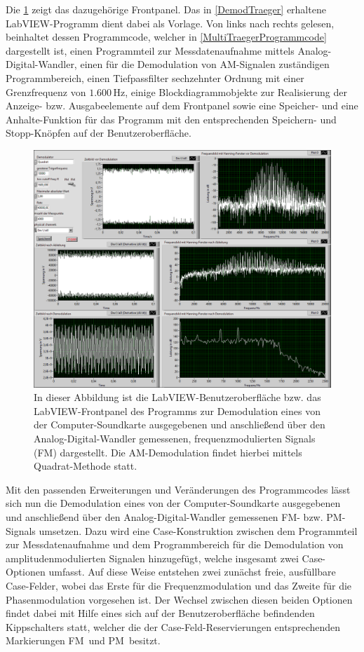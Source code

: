 \documentclass[
a4paper,
12pt,
pagesize,
ngerman
]{scrartcl}
\begin{document}
	\noindent Die \cref{FMPMDemodFrontpanel} zeigt das dazugehörige Frontpanel.
	Das in \cref{DemodTraeger} erhaltene LabVIEW-Programm dient dabei als Vorlage. 
	Von links nach rechts gelesen, beinhaltet dessen Programmcode, welcher in \cref{MultiTraegerProgrammcode} dargestellt ist, einen Programmteil zur Messdatenaufnahme mittels Analog-Digital-Wandler, einen für die Demodulation von AM-Signalen zuständigen Programmbereich, einen Tiefpassfilter sechzehnter Ordnung mit einer Grenzfrequenz von $1.600\,$Hz, einige Blockdiagrammobjekte zur Realisierung der Anzeige- bzw. Ausgabeelemente auf dem Frontpanel sowie eine Speicher- und eine Anhalte-Funktion für das Programm mit den entsprechenden \glqq Speichern\grqq - und \glqq Stopp\grqq -Knöpfen auf der Benutzeroberfläche.
	
	\begin{figure}[H]
		\centering
		\includegraphics[width=1.0\textwidth]{EIRE2018Dateien/Tag4/OsziFMPM-Demod/FM/OsziPlusFMPMp}
		\caption{In dieser Abbildung ist die LabVIEW-Benutzeroberfläche bzw. das LabVIEW-Frontpanel des Programms zur Demodulation eines von der Computer-Soundkarte ausgegebenen und anschließend über den Analog-Digital-Wandler gemessenen, frequenzmodulierten Signals (\glqq FM\grqq ) dargestellt. Die AM-Demodulation findet hierbei mittels \glqq Quadrat\grqq -Methode statt.}
		\label{FMPMDemodFrontpanel}
	\end{figure}
	
	\noindent Mit den passenden Erweiterungen und Veränderungen des Programmcodes lässt sich nun die Demodulation eines von der Computer-Soundkarte ausgegebenen und anschließend über den Analog-Digital-Wandler gemessenen FM- bzw. PM-Signals umsetzen. 
	Dazu wird eine Case-Konstruktion zwischen dem Programmteil zur Messdatenaufnahme und dem Programmbereich für die Demodulation von amplitudenmodulierten Signalen hinzugefügt, welche insgesamt zwei Case-Optionen umfasst.
	Auf diese Weise entstehen zwei zunächst freie, ausfüllbare Case-Felder, wobei das Erste für die Frequenzmodulation und das Zweite für die Phasenmodulation vorgesehen ist.
	Der Wechsel zwischen diesen beiden Optionen findet dabei mit Hilfe eines sich auf der Benutzeroberfläche befindenden Kippschalters statt, welcher die der Case-Feld-Reservierungen entsprechenden Markierungen \glqq FM\grqq\ und \glqq PM\grqq\ besitzt.
	
\end{document}

